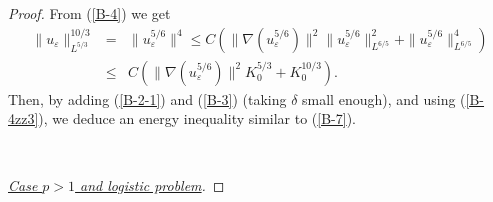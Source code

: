 \documentclass[11pt,reqno]{amsart}%
\numberwithin{equation}{section}
\begin{document}
{\begin{proof}
From (\ref{B-4}) we get
\begin{eqnarray}
\|u_\varepsilon\|^{10/3}_{L^{5/3}}
&=&
\|u_\varepsilon^{5/6}\|^4
\le
C\left(\|\nabla (u_\varepsilon^{5/6})\|^{2}\|u_\varepsilon^{5/6}\|^{2}_{L^{6/5}}
+\|u_\varepsilon^{5/6}\|^4_{L^{6/5}}\right)\nonumber\\
&\le& C\left(\|\nabla (u_\varepsilon^{5/6})\|^{2}K_0^{5/3}+K_0^{10/3}\right).\label{B-4zz3}
\end{eqnarray}
Then, by adding (\ref{B-2-1}) and (\ref{B-3})  (taking $\delta$ small enough), and using (\ref{B-4zz3}), we deduce an energy inequality similar to (\ref{B-7}).

\

{\it \underline{Case $p>1$ and logistic problem}.} 


\end{proof}}
\end{document}
